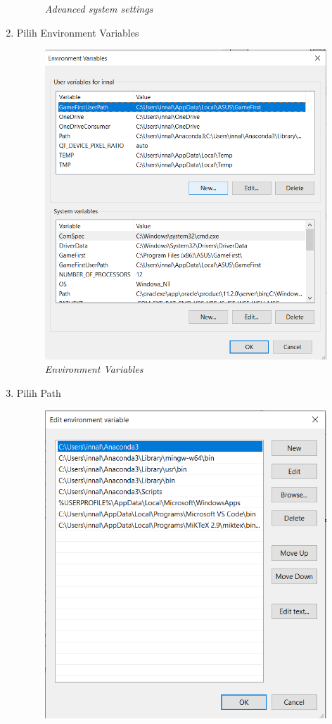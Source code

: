 \begin{enumerate}
\begin{figure}[H]
    \caption{\textit{Advanced system settings}}
    \label{Environment2}
\end{figure}
\item Pilih Environment Variables
\begin{figure}[H]
    \centering
    \includegraphics[scale=0.4]{figures/environment}
    \caption{\textit{Environment Variables}}
    \label{Environment3}
\end{figure}
\item Pilih Path
\begin{figure}[H]
    \centering
    \includegraphics[scale=0.4]{figures/path}

\end{figure}
\end{enumerate}

